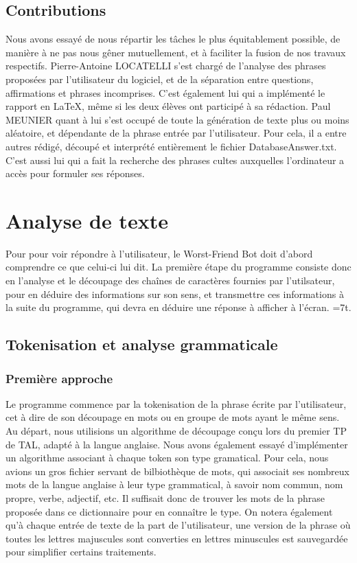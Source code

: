 \documentclass[paper=a4, fontsize=12pt]{article}
\begin{document}
\subsection{Contributions}
	Nous avons essayé de nous répartir les tâches le plus équitablement possible, de manière à ne pas nous gêner mutuellement, et à faciliter la fusion de nos travaux respectifs. Pierre-Antoine LOCATELLI s'est chargé de l'analyse des phrases proposées par l'utilisateur du logiciel, et de la séparation entre questions, affirmations et phrases incomprises. C'est également lui qui a implémenté le rapport en LaTeX, même si les deux élèves ont participé à sa rédaction. Paul MEUNIER quant à lui s'est occupé de toute la génération de texte plus ou moins aléatoire, et dépendante de la phrase entrée par l'utilisateur. Pour cela, il a entre autres rédigé, découpé et interprété entièrement le fichier DatabaseAnswer.txt. C'est aussi lui qui a fait la recherche des phrases cultes auxquelles l'ordinateur a accès pour formuler ses réponses.

\section{Analyse de texte}
	Pour pour voir répondre à l'utilisateur, le Worst-Friend Bot doit d'abord comprendre ce que celui-ci lui dit. La première étape du programme consiste donc en l'analyse et le découpage des chaînes de caractères fournies par l'utilsateur, pour en déduire des informations sur son sens, et transmettre ces informations à la suite du programme, qui devra en déduire une réponse à afficher à l'écran.
\parskip=7t. 

	
\subsection{Tokenisation et analyse grammaticale}
\subsubsection{Première approche}
	Le programme commence par la tokenisation de la phrase écrite par l'utilisateur, cet à dire de son découpage en mots ou en groupe de mots ayant le même sens. Au départ, nous utilisions un algorithme de découpage conçu lors du premier TP de TAL, adapté à la langue anglaise. Nous avons également essayé d'implémenter un algorithme associant à chaque token son type gramatical. Pour cela, nous avions un gros fichier servant de bilbiothèque de mots, qui associait ses nombreux mots de la langue anglaise à leur type grammatical, à savoir \og nom commun\fg{}, \og nom propre\fg{}, \og verbe\fg{}, \og adjectif\fg{}, etc. Il suffisait donc de trouver les mots de la phrase proposée dans ce dictionnaire pour en connaître le type. On notera également qu'à chaque entrée de texte de la part de l'utilisateur, une version de la phrase où toutes les lettres majuscules sont converties en lettres minuscules est sauvegardée pour simplifier certains traitements.
\end{document}
